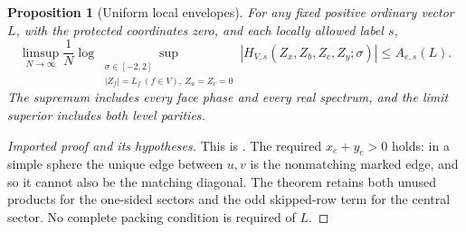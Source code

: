 \documentclass[11pt]{article}
\numberwithin{equation}{section}
\newtheorem{proposition}[theorem]{Proposition}
\theoremstyle{definition}\newtheorem{definition}[theorem]{Definition}
\theoremstyle{remark}\newtheorem{remark}[theorem]{Remark}
\begin{document}
\begin{proposition}[Uniform local envelopes]\label{pc:local-import}
For any fixed positive ordinary vector \(L\), with the protected
coordinates zero, and each locally allowed label \(s\),
\[
 \limsup_{N\to\infty}\frac1N
 \log\sup_{\substack{\sigma\in[-2,2]\\
                    |Z_f|=L_f\ (f\in V),\ Z_u=Z_v=0}}
 |H_{V,s}(Z_x,Z_b,Z_c,Z_y;\sigma)|
                  \le A_{e,s}(L).
\]
The supremum includes every face phase and every real spectrum, and
the limit superior includes both level parities.
\end{proposition}
\begin{proof}[Imported proof and its hypotheses]
This is \cite[Theorem 1.1]{CasimirSources}. The required \(x_e+y_e>0\)
holds: in a simple sphere the unique edge between \(u,v\) is the
nonmatching marked edge, and so it cannot also be the matching
diagonal. The theorem retains both unused products for the one-sided
sectors and the odd skipped-row term for the central sector.
No complete packing condition is required of \(L\).
\end{proof}
\end{document}
